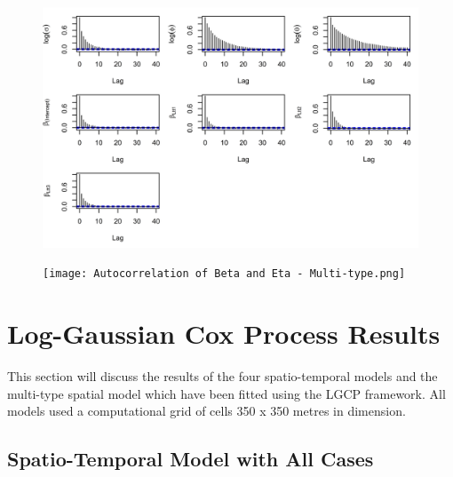 \begin{figure}[h]
    \begin{center}
        \includegraphics[scale=1]{Autocorrelation of Beta and Eta - All Cases.png}
    \end{center}
     \label{fig:correlation-plots-all-cases}
\end{figure}

\begin{figure}[H]
    \begin{center}
        \texttt{[image: Autocorrelation of Beta and Eta - Multi-type.png]}
    \end{center}
     \label{fig:correlation-plots-multi-type}
\end{figure}


\section{Log-Gaussian Cox Process Results} \label{sec:model-results}

This section will discuss the results of the four spatio-temporal models and the multi-type spatial model which have been fitted using the LGCP framework. 
All models used a computational grid of cells 350 x 350 metres in dimension.

\subsection{Spatio-Temporal Model with All Cases}

